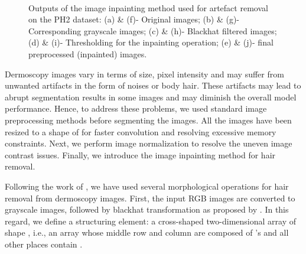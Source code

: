 \documentclass[review]{elsarticle}
\begin{document}
\begin{figure*}
    \centering
    \\
    \caption{Outputs of the image inpainting method used for artefact removal on the PH2 dataset: (a) \& (f)- Original images; (b) \& (g)- Corresponding grayscale images; (c) \& (h)- Blackhat filtered images; (d) \& (i)- Thresholding for the inpainting operation; (e) \& (j)- final preprocessed (inpainted) images.}
    \label{inpaint}
\end{figure*}



Dermoscopy images vary in terms of size, pixel intensity and may suffer from unwanted artifacts in the form of noises or body hair. These artifacts may lead to abrupt segmentation results in some images and may diminish the overall model performance. Hence, to address these problems, we used standard image preprocessing methods before segmenting the images. All the images have been resized to a shape of  for faster convolution and resolving excessive memory constraints. Next, we perform image normalization to resolve the uneven image contrast issues. Finally, we introduce the image inpainting method for hair removal.

Following the work of \cite{telea2004image}, we have used several morphological operations for hair removal from dermoscopy images. First, the input RGB images are converted to grayscale images, followed by blackhat transformation as proposed by \cite{wang2014morphological}. In this regard, we define a structuring element: a cross-shaped two-dimensional array of shape , i.e., an array whose middle row and column are composed of 's and all other places contain . 
\end{document}
